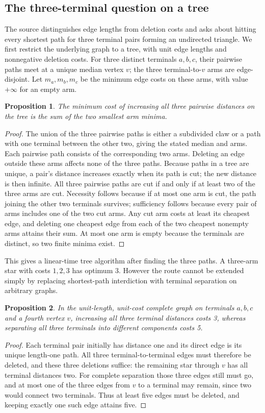 \documentclass[11pt]{article}
\newtheorem{proposition}{Proposition}
\begin{document}
\subsection{The three-terminal question on a tree}
The source distinguishes edge lengths from deletion costs and asks about hitting every shortest path for three terminal pairs forming an undirected triangle. We first restrict the underlying graph to a tree, with unit edge lengths and nonnegative deletion costs. For three distinct terminals $a,b,c$, their pairwise paths meet at a unique median vertex $v$; the three terminal-to-$v$ arms are edge-disjoint. Let $m_a,m_b,m_c$ be the minimum edge costs on these arms, with value $+\infty$ for an empty arm.
\begin{proposition}
The minimum cost of increasing all three pairwise distances on the tree is the sum of the two smallest arm minima.
\end{proposition}
\begin{proof}
The union of the three pairwise paths is either a subdivided claw or a path with one terminal between the other two, giving the stated median and arms. Each pairwise path consists of the corresponding two arms. Deleting an edge outside these arms affects none of the three paths. Because paths in a tree are unique, a pair's distance increases exactly when its path is cut; the new distance is then infinite. All three pairwise paths are cut if and only if at least two of the three arms are cut. Necessity follows because if at most one arm is cut, the path joining the other two terminals survives; sufficiency follows because every pair of arms includes one of the two cut arms. Any cut arm costs at least its cheapest edge, and deleting one cheapest edge from each of the two cheapest nonempty arms attains their sum. At most one arm is empty because the terminals are distinct, so two finite minima exist.
\end{proof}
This gives a linear-time tree algorithm after finding the three paths. A three-arm star with costs $1,2,3$ has optimum 3. However the route cannot be extended simply by replacing shortest-path interdiction with terminal separation on arbitrary graphs.
\begin{proposition}
In the unit-length, unit-cost complete graph on terminals $a,b,c$ and a fourth vertex $v$, increasing all three terminal distances costs 3, whereas separating all three terminals into different components costs 5.
\end{proposition}
\begin{proof}
Each terminal pair initially has distance one and its direct edge is its unique length-one path. All three terminal-to-terminal edges must therefore be deleted, and these three deletions suffice: the remaining star through $v$ has all terminal distances two. For complete separation those three edges still must go, and at most one of the three edges from $v$ to a terminal may remain, since two would connect two terminals. Thus at least five edges must be deleted, and keeping exactly one such edge attains five.
\end{proof}
\end{document}
